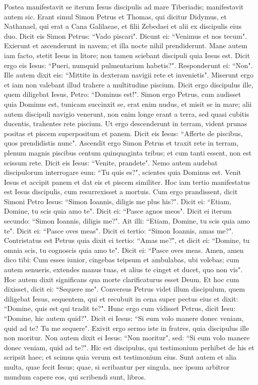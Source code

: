 \begin{biblechapter} 
\verse Postea manifestavit se iterum Iesus discipulis ad mare Tiberiadis; manifestavit autem sic. 
\verse Erant simul Simon Petrus et Thomas, qui dicitur Didymus, et Nathanael, qui erat a Cana Galilaeae, et filii Zebedaei et alii ex discipulis eius duo. 
\verse Dicit eis Simon Petrus: “Vado piscari". Dicunt ei: “Venimus et nos tecum". Exierunt et ascenderunt in navem; et illa nocte nihil prendiderunt. 
\verse Mane autem iam facto, stetit Iesus in litore; non tamen sciebant discipuli quia Iesus est. 
\verse Dicit ergo eis Iesus: “Pueri, numquid pulmentarium habetis?". Responderunt ei: “Non". 
\verse Ille autem dixit eis: “Mittite in dexteram navigii rete et invenietis". Miserunt ergo et iam non valebant illud trahere a multitudine piscium. 
\verse Dicit ergo discipulus ille, quem diligebat Iesus, Petro: “Dominus est!". Simon ergo Petrus, cum audisset quia Dominus est, tunicam succinxit se, erat enim nudus, et misit se in mare; 
\verse alii autem discipuli navigio venerunt, non enim longe erant a terra, sed quasi cubitis ducentis, trahentes rete piscium. 
\verse Ut ergo descenderunt in terram, vident prunas positas et piscem superpositum et panem. 
\verse Dicit eis Iesus: “Afferte de piscibus, quos prendidistis nunc". 
\verse Ascendit ergo Simon Petrus et traxit rete in terram, plenum magnis piscibus centum quinquaginta tribus; et cum tanti essent, non est scissum rete. 
\verse Dicit eis Iesus: “Venite, prandete". Nemo autem audebat discipulorum interrogare eum: “Tu quis es?", scientes quia Dominus est.
\verse Venit Iesus et accipit panem et dat eis et piscem similiter. 
\verse Hoc iam tertio manifestatus est Iesus discipulis, cum resurrexisset a mortuis. 
\verse Cum ergo prandissent, dicit Simoni Petro Iesus: “Simon Ioannis, diligis me plus his?". Dicit ei: “Etiam, Domine, tu scis quia amo te". Dicit ei: “Pasce agnos meos". 
\verse Dicit ei iterum secundo: “Simon Ioannis, diligis me?". Ait illi: “Etiam, Domine, tu scis quia amo te". Dicit ei: “Pasce oves meas".  
\verse Dicit ei tertio: “Simon Ioannis, amas me?". Contristatus est Petrus quia dixit ei tertio: “Amas me?", et dicit ei: “Domine, tu omnia scis, tu cognoscis quia amo te". Dicit ei: “Pasce oves meas. 
\verse Amen, amen dico tibi: Cum esses iunior, cingebas teipsum et ambulabas, ubi volebas; cum autem senueris, extendes manus tuas, et alius te cinget et ducet, quo non vis".  
\verse Hoc autem dixit significans qua morte clarificaturus esset Deum. Et hoc cum dixisset, dicit ei: “Sequere me". 
\verse Conversus Petrus videt illum discipulum, quem diligebat Iesus, sequentem, qui et recubuit in cena super pectus eius et dixit: “Domine, quis est qui tradit te?". 
\verse Hunc ergo cum vidisset Petrus, dicit Iesu: “Domine, hic autem quid?". 
\verse Dicit ei Iesus: “Si eum volo manere donec veniam, quid ad te? Tu me sequere". 
\verse Exivit ergo sermo iste in fratres, quia discipulus ille non moritur. Non autem dixit ei Iesus: “Non moritur", sed: “Si eum volo manere donec veniam, quid ad te?". 
\verse Hic est discipulus, qui testimonium perhibet de his et scripsit haec; et scimus quia verum est testimonium eius. 
\verse Sunt autem et alia multa, quae fecit Iesus; quae, si scribantur per singula, nec ipsum arbitror mundum capere eos, qui scribendi sunt, libros.
\end{biblechapter}

